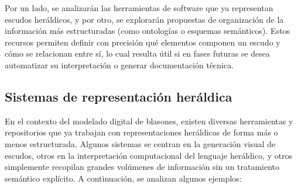Por un lado, se analizarán las herramientas de software que ya representan escudos heráldicos,
y por otro, se explorarán propuestas de organización de la información más estructuradas
(como ontologías o esquemas semánticos). Estos recursos permiten definir con precisión
qué elementos componen un escudo y cómo se relacionan entre sí, lo cual resulta útil si
en fases futuras se desea automatizar su interpretación o generar documentación técnica.

\subsection{Sistemas de representación heráldica}
En el contexto del modelado digital de blasones, existen diversas herramientas y repositorios
que ya trabajan con representaciones heráldicas de forma más o menos estructurada. Algunos 
sistemas se centran en la generación visual de escudos, otros en la interpretación computacional
del lenguaje heráldico, y otros simplemente recopilan grandes volúmenes de información sin un
tratamiento semántico explícito. A continuación, se analizan algunos ejemplos:

